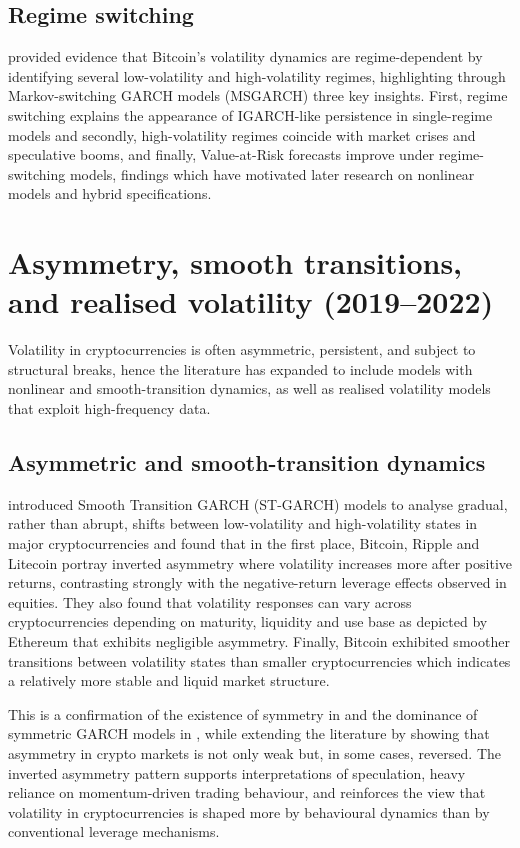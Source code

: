 \documentclass[12pt]{report}
\begin{document}
\subsection{Regime switching}

\cite{ardia2019regime} provided evidence that Bitcoin’s volatility dynamics are regime-dependent by identifying several low-volatility and high-volatility regimes, highlighting through Markov-switching GARCH models (MSGARCH) three key insights. First, regime switching explains the appearance of IGARCH-like persistence in single-regime models and secondly, high-volatility regimes coincide with market crises and speculative booms, and finally, Value-at-Risk forecasts improve under regime-switching models, findings which have motivated later research on nonlinear models and hybrid specifications.

\section{Asymmetry, smooth transitions, and realised volatility (2019–2022)}

Volatility in cryptocurrencies is often asymmetric, persistent, and subject to structural breaks, hence the literature has expanded to include models with nonlinear and smooth-transition dynamics, as well as realised volatility models that exploit high-frequency data.

\subsection{Asymmetric and smooth-transition dynamics}

\cite{bencheikh2020stgarch} introduced Smooth Transition GARCH (ST-GARCH) models to analyse gradual, rather than abrupt, shifts between low-volatility and high-volatility states in major cryptocurrencies and found that in the first place, Bitcoin, Ripple and Litecoin portray inverted asymmetry where volatility increases more after positive returns, contrasting strongly with the negative-return leverage effects observed in equities. They also found that volatility responses can vary across cryptocurrencies depending on maturity, liquidity and use base as depicted by Ethereum that exhibits negligible asymmetry. Finally, Bitcoin exhibited smoother transitions between volatility states than smaller cryptocurrencies which indicates a relatively more stable and liquid market structure.

This is a confirmation of the existence of symmetry in \cite{dyhrberg2016bitcoin} and the dominance of symmetric GARCH models in \cite{chu2017garchcrypto}, while extending the literature by showing that asymmetry in crypto markets is not only weak but, in some cases, reversed. The inverted asymmetry pattern supports interpretations of speculation, heavy reliance on momentum-driven trading behaviour, and reinforces the view that volatility 
in cryptocurrencies is shaped more by behavioural dynamics than by conventional 
leverage mechanisms.
\end{document}
